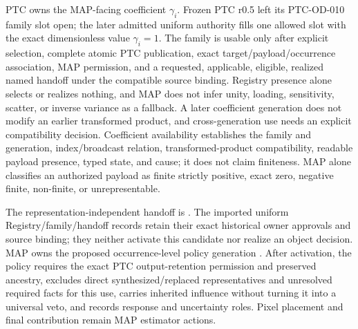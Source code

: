 \documentclass[10pt]{article}
\begin{document}
PTC owns the MAP-facing coefficient \(\gamma_i\). Frozen PTC r0.5 left its
PTC-OD-010 family slot open; the later admitted uniform authority fills one
allowed slot with the exact dimensionless value \(\gamma_i=1\). The family is
usable only after explicit selection, complete atomic PTC publication, exact
target/payload/occurrence association, MAP permission, and a requested,
applicable, eligible, realized named handoff under the compatible source
binding. Registry presence alone selects or realizes nothing, and MAP does not
infer unity, loading, sensitivity, scatter, or inverse variance as a fallback.
A later coefficient generation does not modify an earlier transformed
product, and cross-generation use needs an explicit compatibility decision.
Coefficient availability establishes the family and generation,
index/broadcast relation, transformed-product compatibility, readable payload
presence, typed state, and cause; it does not claim finiteness. MAP alone
classifies an authorized payload as finite strictly positive, exact zero,
negative finite, non-finite, or unrepresentable.

The representation-independent handoff is
\SCIMapPTCMapBoundaryId. The imported uniform Registry/family/handoff records
retain their exact historical owner approvals and source binding; they neither
activate this candidate nor realize an object decision. MAP owns the proposed
occurrence-level policy generation \SCIMapUpstreamProfile.
\SCIMapCandidateProfileStatusDefinition{} After activation, the policy requires the exact PTC output-retention
permission and preserved ancestry, excludes direct synthesized/replaced
representatives and unresolved required facts for this use, carries inherited
influence without turning it into a universal veto, and records response and
uncertainty roles. Pixel placement and final contribution remain MAP
estimator actions.
\end{document}
